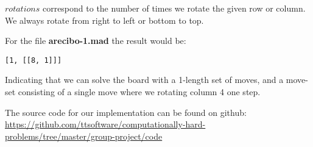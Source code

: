 \documentclass[12pt]{article}
\begin{document}
$rotations$ correspond to the number of times we rotate the given row or column. We always rotate from right to left or bottom to top.

For the file \textbf{arecibo-1.mad} the result would be:

\begin{lstlisting}
[1, [[8, 1]]]
\end{lstlisting}

Indicating that we can solve the board with a 1-length set of moves, and a move-set consisting of a single move where we rotating column 4 one step.

The source code for our implementation can be found on github: \url{https://github.com/ttsoftware/computationally-hard-problems/tree/master/group-project/code}
\end{document}
